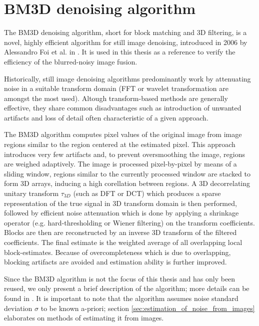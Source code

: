 \documentclass[12pt,notitlepage]{report}
\begin{document}
\section{BM3D denoising algorithm}
\label{sec:bm3d_denoising_algorithm}

The BM3D denoising algorithm, short for block matching and 3D filtering, is a novel, highly efficient algorithm for still image denoising, introduced in 2006 by Alessandro Foi et al. in \cite{bm3d}. It is used in this thesis as a reference to verify the efficiency of the blurred-noisy image fusion.

Historically, still image denoising algorithms predominantly work by attenuating noise in a suitable transform domain (FFT or wavelet transformation are amongst the most used). Altough transform-based methods are generally effective, they share common disadvantages such as introduction of unwanted artifacts and loss of detail often characteristic of a given approach. 

The BM3D algorithm computes pixel values of the original image from image regions similar to the region centered at the estimated pixel. This approach introduces very few artifacts and, to prevent oversmoothing the image, regions are weighed adaptively. The image is processed pixel-by-pixel by means of a sliding window, regions similar to the currently processed window are stacked to form 3D arrays, inducing a high corellation between regions. A 3D decorrelating unitary transform $\tau_{3D}$ (such as DFT or DCT) which produces a sparse representation of the true signal in 3D transform domain is then performed, followed by efficient noise attenuation which is done by applying a shrinkage operator (e.g. hard-thresholding or Wiener filtering) on the transform coefficients. Blocks are then are reconstructed by an inverse 3D transform of the filtered coefficients. The final estimate is the weighted average of all overlapping local block-estimates. Because of overcompleteness which is due to overlapping, blocking artifacts are avoided and estimation ability is further improved. 

Since the BM3D algorithm is not the focus of this thesis and has only been reused, we only present a brief description of the algorithm; more details can be found in \cite{bm3d}. It is important to note that the algorithm assumes noise standard deviation $\sigma$ to be known a-priori; section \ref{sec:estimation_of_noise_from_images} elaborates on methods of estimating it from images. 
\end{document}
